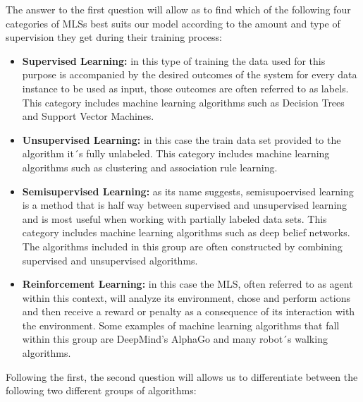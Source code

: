 \documentclass[12pt, a4paper]{article}
\begin{document}
	The answer to the first question will allow as to find which of the following four categories of MLSs best suits our model according to the amount and type of supervision they get during their training process: 
	
	\begin{itemize}
	
	\item \textbf{Supervised Learning:} in this type of training the data used for this purpose is accompanied by the desired outcomes of the system for every data instance to be used as input, those outcomes are often referred to as labels. This category includes machine learning algorithms such as Decision Trees and Support Vector Machines.
	
	\item \textbf{Unsupervised Learning:} in this case the train data set provided to the algorithm it´s fully unlabeled. This category includes machine learning algorithms such as clustering and association rule learning.
	
	\item \textbf{Semisupervised Learning:} as its name suggests, semisupoervised learning is a method that is half way between supervised and unsupervised learning and is most useful when working with partially labeled data sets. This category includes machine learning algorithms such as deep belief networks. The algorithms included in this group are often constructed by combining supervised and unsupervised algorithms.
	
	\item \textbf{Reinforcement Learning:} in this case the MLS, often referred to as agent within this context, will analyze its environment, chose and perform actions and then receive a reward or penalty as a consequence of its interaction with the environment. Some examples of machine learning algorithms that fall within this group are DeepMind’s AlphaGo and many robot´s walking algorithms. 
	
	\end{itemize}

	Following the first, the second question will allows us to differentiate between the following two different groups of algorithms:
	
\end{document}
